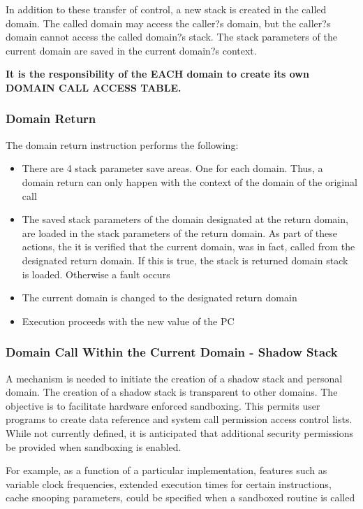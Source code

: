 \documentclass{article}
\begin{document}
\begin{appendices}
In addition to these transfer of control, a new stack is created  in the called domain.  The called domain may access the caller?s domain,  but the caller?s domain cannot access the called domain?s stack. The  stack parameters of the current domain are saved in the current domain?s context.

\textbf{It is the responsibility of the EACH domain to create its own DOMAIN CALL ACCESS TABLE.}

\subsubsection{Domain Return}

The domain return  instruction performs   the following:

\begin{itemize}
\item There are 4 stack parameter save areas.  One for each domain.  Thus, a domain return can only happen with the context of the  domain of the original call
\item The saved stack parameters of the domain designated at the return domain,  are loaded in the stack parameters of the return domain.  As part of these actions, the it is verified that the current domain, was in fact, called from the designated return domain.  If this is true, the stack is returned domain stack is loaded.  Otherwise a fault occurs
\item The current domain is changed to the designated return domain
\item Execution  proceeds with the new value of the PC
\end{itemize}

\subsubsection{Domain Call Within the Current Domain - Shadow Stack}

A mechanism is needed  to initiate the  creation of a shadow stack and personal domain.  The creation of a shadow stack is transparent to  other  domains.  The objective is to facilitate hardware enforced sandboxing. This permits  user programs to create data reference and system call  permission access control lists. While not  currently defined,   it is anticipated that  additional security permissions be  provided when sandboxing is enabled. 

For example,  as a function of a particular implementation,  features such as variable clock frequencies, extended execution times for certain instructions,  cache snooping parameters,  could be specified when a sandboxed routine is called



\end{appendices}
\end{document}
